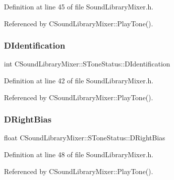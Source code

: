 Definition at line 45 of file Sound\+Library\+Mixer.\+h.



Referenced by C\+Sound\+Library\+Mixer\+::\+Play\+Tone().

\hypertarget{structCSoundLibraryMixer_1_1SToneStatus_a4573954af1301756c08e09951bb5446d}{}\label{structCSoundLibraryMixer_1_1SToneStatus_a4573954af1301756c08e09951bb5446d} 
\subsubsection{\texorpdfstring{D\+Identification}{DIdentification}}
{\footnotesize\ttfamily int C\+Sound\+Library\+Mixer\+::\+S\+Tone\+Status\+::\+D\+Identification}



Definition at line 42 of file Sound\+Library\+Mixer.\+h.



Referenced by C\+Sound\+Library\+Mixer\+::\+Play\+Tone().

\hypertarget{structCSoundLibraryMixer_1_1SToneStatus_abb913d4ba795bfd4f1734138bc15018d}{}\label{structCSoundLibraryMixer_1_1SToneStatus_abb913d4ba795bfd4f1734138bc15018d} 
\subsubsection{\texorpdfstring{D\+Right\+Bias}{DRightBias}}
{\footnotesize\ttfamily float C\+Sound\+Library\+Mixer\+::\+S\+Tone\+Status\+::\+D\+Right\+Bias}



Definition at line 48 of file Sound\+Library\+Mixer.\+h.



Referenced by C\+Sound\+Library\+Mixer\+::\+Play\+Tone().

\hypertarget{structCSoundLibraryMixer_1_1SToneStatus_ae7b7cfd4de145fc06d5a6e93e8ef75d3}{}\label{structCSoundLibraryMixer_1_1SToneStatus_ae7b7cfd4de145fc06d5a6e93e8ef75d3} 
